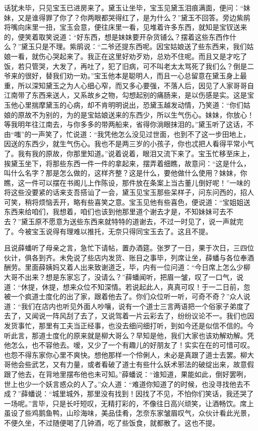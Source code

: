 话犹未毕，只见宝玉已进房来了。黛玉让坐毕，宝玉见黛玉泪痕满面，便问：“妹妹，又是谁得罪了你了？你两眼都哭得红了，是为什么？”黛玉不回答。旁边紫鹃将嘴向床里一扭，宝玉会意，便往床里一看，见堆着许多东西，就知是宝钗送来的，便笑着取笑说道：“好东西，想是妹妹要开杂货铺么？摆着这些东西作什么？”黛玉只是不理。紫鹃说：“二爷还提东西呢。因宝姑娘送了些东西来，我们姑娘一看，就伤心哭起来了。我正在这里好劝歹劝，总劝不住呢。而且又是才吃了饭，若只管哭，大发了，再吐了，犯了旧病，可不叫老太太骂死了我们么？倒是二爷来的很好，替我们劝一劝。”宝玉他本是聪明人，而且一心总留意在黛玉身上最重，所以深知黛玉之为人心细心窄，而又多心要强，不落人后，因见了人家哥哥自江南带了东西来送人，又系故乡之物，勾想起别的痛肠来，是以伤感是实。这是宝玉他心里揣摩黛玉的心病，却不肯明明说出，恐黛玉越发动情，乃笑道：“你们姑娘的原故不为别的，为的是宝姑娘送来的东西少，所以生气伤心。妹妹，你放心！等我明年往江南去，与你多多的带两船来，省得你淌眼抹泪的。”黛玉听了这话，不由“嗤”的一声笑了，忙说道：“我凭他怎么没见过世面，也到不了这一步田地上，因送的东西少，就生气伤心。我也不是两三岁的小孩子，你也忒把人看得平常小气了。我有我的原故，你那里知道。”说着说着，眼泪又流下来了。宝玉忙移至床上，挨黛玉坐下，将那些东西一件一件的拿起来，摆弄着细瞧，故意问：“这是什么，叫什么名字？那是怎么做的，这样齐整？这是什么，要他做什么使用？妹妹，你瞧，这一件可以摆在书阁儿上作陈设，那件放在条案上当古董儿倒好呢！”一味的将这些没要紧的话来支吾搭讪了一会，黛玉见宝玉那些呆样子，问东问西的，招人可笑，稍将烦恼丢开，略有些喜笑之意。宝玉见他有些喜色，便说道：“宝姐姐送东西来给咱们，我想着，咱们也该到他那里道个谢去才是，不知妹妹可去不去？”黛玉原不愿意为送些东西来就特特的道谢去，不过一时见了，说一声就完了。今被宝玉说得有理难以推托，无奈只得同宝玉去了。这且不提。

且说薛蟠听了母亲之言，急忙下请帖，置办酒筵。张罗了一日，果于次日，三四位伙计，俱各到齐。未免说了些店内发货、账目之事毕，列席让坐，薛蟠与各位奉酒酬劳。里面薛姨妈又着人出来致谢道乏，毕，内有一位问道：“今日席上怎么少柳大哥不出来？想是东家忘了，没请么？”薛蟠闻听，把眉一皱，叹了一口气，说道：“休提，休提，想来众位不知深情。若说起此人，真真可叹！于一二日前，忽被一个疯道士度化的出了家，跟着他去了。你们众位听一听，可奇不奇？”众人说道：“我们在店内也听见外面人吵嚷，说有一个道士三言两语把一个俗家子弟度了去了，又闻说一阵风刮了去了，又说驾着一片云彩去了，纷纷议论不一。我们也因发货事忙，那里有工夫当正经事，也没去细问细打听，到如今还是似信不信的。今听此言，那道士度化的原来就是柳大哥么？早知是他，我们大家也该劝解劝解。凭他怎么，也不容他去。嗳，又少了一个有趣儿的好朋友了！实实在在的可惜可叹。也怨不得东家你心里不爽快。想他那样一个伶俐人，未必是真跟了道士去罢。柳大哥他会些武艺，又有力量，或者看破了道士有些什么妖术邪法的破绽出来，故意假跟了他去，在背地里摆布他也未可知。”薛蟠说：“谁知道，果能如此，倒好罢咧，世上也少一个妖言惑众的人了。”众人道：“难道你知道了的时候，也没寻找他去不成？”薛蟠说：“城里城外，那里没有找到！因找了不见，不怕你们笑话，我还哭了一场呢。”言毕，只是长吁短叹，无精打彩的，不像往日高兴顽笑，让酒畅饮。席上虽设了些鸡鹅鱼鸭，山珍海味，美品佳肴，怎奈东家皱眉叹气，众伙计看此光景，不便久坐，不过随便喝了几钟酒，吃了些饭食，就都散了。这也不提。

